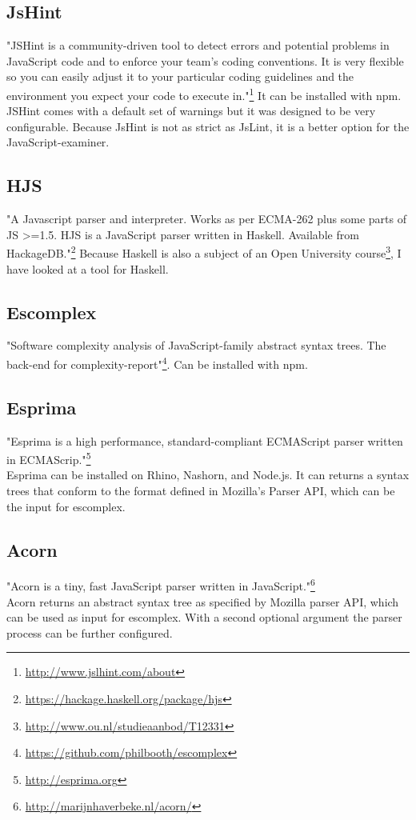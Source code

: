 \documentclass{article}
\begin{document}
\subsection{JsHint}
"JSHint is a community-driven tool to detect errors and potential problems in JavaScript 
code and to enforce your team's coding conventions. It is very flexible so you can 
easily adjust it to your particular coding guidelines and the environment you 
expect your code to execute in."\footnote{\url{http://www.jslhint.com/about}}
It can be installed with npm.
JSHint comes with a default set of warnings but it was designed to be very configurable.
Because JsHint is not as strict as JsLint, it is a better option for the JavaScript-examiner.

\subsection{HJS}
"A Javascript parser and interpreter. Works as per ECMA-262 plus some parts of JS >=1.5.
HJS is a JavaScript parser written in Haskell. Available from HackageDB."\footnote{\url{https://hackage.haskell.org/package/hjs}}
Because Haskell is also a subject of an Open University course\footnote{\url{http://www.ou.nl/studieaanbod/T12331}}, I have looked at a tool for Haskell.

\subsection{Escomplex}
"Software complexity analysis of JavaScript-family abstract syntax trees. The back-end for complexity-report"\footnote{\url{https://github.com/philbooth/escomplex}}.
Can be installed with npm.

\subsection{Esprima}
"Esprima is a high performance, standard-compliant ECMAScript parser written in ECMAScrip."\footnote{\url{http://esprima.org}}\\
Esprima can be installed on Rhino, Nashorn, and Node.js.
It can returns a syntax trees that conform to the format defined in Mozilla's Parser API, which can be the input for escomplex.

\subsection{Acorn}
"Acorn is a tiny, fast JavaScript parser written in JavaScript."\footnote{\url{http://marijnhaverbeke.nl/acorn/}}\\
Acorn returns an abstract syntax tree as specified by Mozilla parser API, which can be used as input for escomplex.
With a second optional argument the parser process can be further configured.
\end{document}
